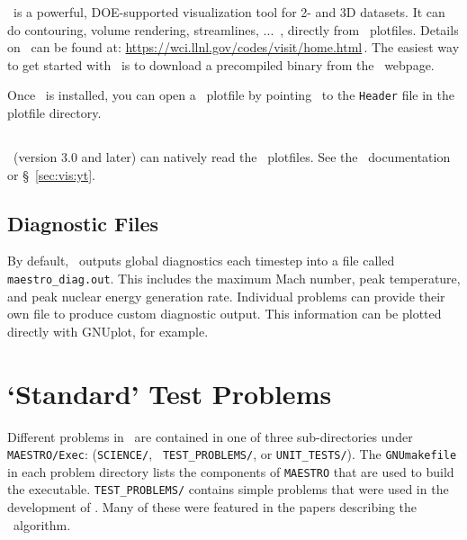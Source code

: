 \visit\ is a powerful, DOE-supported visualization tool for 2- and 3D
datasets.  It can do contouring, volume rendering, streamlines, ...\, ,
directly from \boxlib\ plotfiles.   Details on
\visit\ can be found at:\newline
 \url{https://wci.llnl.gov/codes/visit/home.html}\,. \newline
The easiest way to get started with \visit\ is to download a precompiled
binary from the \visit\ webpage.

Once \visit\ is installed, you can open a \boxlib\ plotfile by pointing
\visit\ to the {\tt Header} file in the plotfile directory.


\subsection{\yt}

\yt\ (version 3.0 and later) can natively read the \maestro\ plotfiles.  See
the \yt\ documentation or \S~\ref{sec:vis:yt}.



\subsection{Diagnostic Files}

By default, \maestro\ outputs global diagnostics each timestep into a
file called {\tt maestro\_diag.out}.  This includes the maximum Mach
number, peak temperature, and peak nuclear energy generation rate.
Individual problems can provide their own  file to
produce custom diagnostic output.  This information can be plotted
directly with {\sf GNUplot}, for example.




\section{`Standard' Test Problems}

Different problems in \maestro\ are contained in one of three
sub-directories under {\tt MAESTRO/Exec}: ({\tt SCIENCE/}, {\tt
TEST\_PROBLEMS/}, or {\tt UNIT\_TESTS/}).  The {\tt GNUmakefile} in each
problem directory lists the components of {\tt MAESTRO} that are used
to build the executable.  {\tt TEST\_PROBLEMS/} contains simple
problems that were used in the development of \maestro.  Many
of these were featured in the papers describing the \maestro\ algorithm.


